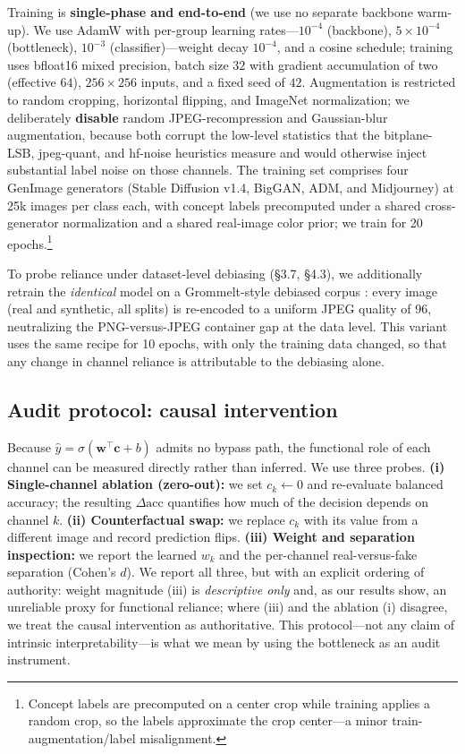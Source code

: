 Training is \textbf{single-phase and end-to-end} (we use no separate backbone warm-up). We use AdamW \citep{loshchilov2019adamw} with per-group learning rates---\(10^{-4}\) (backbone), \(5\times10^{-4}\) (bottleneck), \(10^{-3}\) (classifier)---weight decay \(10^{-4}\), and a cosine schedule; training uses bfloat16 mixed precision, batch size \(32\) with gradient accumulation of two (effective \(64\)), \(256\times256\) inputs, and a fixed seed of \(42\). Augmentation is restricted to random cropping, horizontal flipping, and ImageNet normalization; we deliberately \textbf{disable} random JPEG-recompression and Gaussian-blur augmentation, because both corrupt the low-level statistics that the bitplane-LSB, jpeg-quant, and hf-noise heuristics measure and would otherwise inject substantial label noise on those channels. The training set comprises four GenImage \citep{zhu2023genimage} generators (Stable Diffusion v1.4, BigGAN, ADM, and Midjourney) at 25k images per class each, with concept labels precomputed under a shared cross-generator normalization and a shared real-image color prior; we train for 20 epochs.\footnote{Concept labels are precomputed on a center crop while training applies a random crop, so the labels approximate the crop center---a minor train-augmentation/label misalignment.}

To probe reliance under dataset-level debiasing (\S{}3.7, \S{}4.3), we additionally retrain the \emph{identical} model on a Grommelt-style debiased corpus \citep{grommelt2024fakejpeg}: every image (real and synthetic, all splits) is re-encoded to a uniform JPEG quality of 96, neutralizing the PNG-versus-JPEG container gap at the data level. This variant uses the same recipe for 10 epochs, with only the training data changed, so that any change in channel reliance is attributable to the debiasing alone.

\subsection{Audit protocol: causal intervention}

Because \(\hat{y}=\sigma(\mathbf{w}^\top\mathbf{c}+b)\) admits no bypass path, the functional role of each channel can be measured directly rather than inferred. We use three probes. \textbf{(i) Single-channel ablation (zero-out):} we set \(c_k\leftarrow0\) and re-evaluate balanced accuracy; the resulting \(\Delta\text{acc}\) quantifies how much of the decision depends on channel \(k\). \textbf{(ii) Counterfactual swap:} we replace \(c_k\) with its value from a different image and record prediction flips. \textbf{(iii) Weight and separation inspection:} we report the learned \(w_k\) and the per-channel real-versus-fake separation (Cohen's \(d\)). We report all three, but with an explicit ordering of authority: weight magnitude (iii) is \emph{descriptive only} and, as our results show, an unreliable proxy for functional reliance; where (iii) and the ablation (i) disagree, we treat the causal intervention as authoritative. This protocol---not any claim of intrinsic interpretability---is what we mean by using the bottleneck as an audit instrument.

